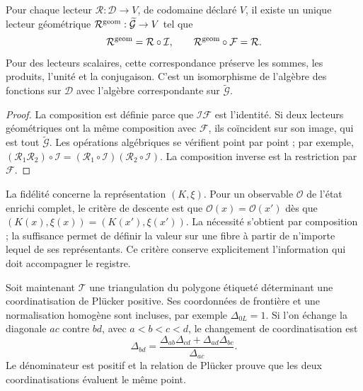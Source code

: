 \begin{theorem}
\label{thm:compat-algebra-lectores}
Pour chaque lecteur \(\mathcal R:\mathcal D\to V\), de codomaine
déclaré \(V\), il existe un unique lecteur géométrique
\(\mathcal R^{\rm geom}:\widetilde{\mathcal G}\to V\) tel que
\[
 \mathcal R^{\rm geom}=\mathcal R\circ\mathcal I,
 \qquad \mathcal R^{\rm geom}\circ\mathcal F=\mathcal R.
\]
Pour des lecteurs scalaires, cette correspondance préserve les sommes, les produits, l'unité et la conjugaison. C'est un isomorphisme de l'algèbre des fonctions sur \(\mathcal D\) avec l'algèbre correspondante sur \(\widetilde{\mathcal G}\).
\end{theorem}
\begin{proof}
La composition est définie parce que \(\mathcal I\mathcal F\) est
l’identité. Si deux lecteurs géométriques ont la même composition
avec \(\mathcal F\), ils coïncident sur son image, qui est tout
\(\widetilde{\mathcal G}\). Les opérations algébriques se vérifient
point par point ; par exemple,
\((\mathcal R_1\mathcal R_2)\circ\mathcal I=
(\mathcal R_1\circ\mathcal I)(\mathcal R_2\circ\mathcal I)\).
La composition inverse est la restriction par \(\mathcal F\).
\end{proof}

La fidélité concerne la représentation \((K,\xi)\). Pour un observable \(\mathcal O\) de l'état enrichi complet, le critère de descente est que \(\mathcal O(x)=\mathcal O(x')\) dès que \((K(x),\xi(x))=(K(x'),\xi(x'))\). La nécessité s'obtient par composition ; la suffisance permet de définir la valeur sur une fibre à partir de n'importe lequel de ses représentants. Ce critère conserve explicitement l'information qui doit accompagner le registre.

Soit maintenant \(\mathcal T\) une triangulation du polygone étiqueté déterminant une coordinatisation de Plücker positive. Ses coordonnées de frontière et une normalisation homogène sont incluses, par exemple \(\Delta_{0L}=1\). Si l'on échange la diagonale \(ac\) contre \(bd\), avec \(a<b<c<d\), le changement de coordinatisation est
\begin{equation}
 \Delta_{bd}=
 \frac{\Delta_{ab}\Delta_{cd}+\Delta_{ad}\Delta_{bc}}{\Delta_{ac}}.
 \label{eq:compat-cambio-carta}
\end{equation}
Le dénominateur est positif et la relation de Plücker prouve que les deux coordinatisations évaluent le même point.

